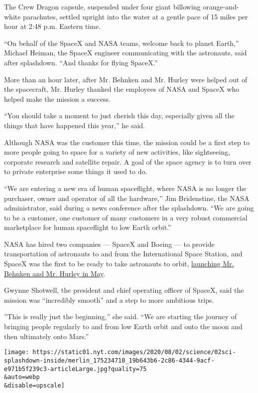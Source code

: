 The Crew Dragon capsule, suspended under four giant billowing
orange-and-white parachutes, settled upright into the water at a gentle
pace of 15 miles per hour at 2:48 p.m. Eastern time.

``On behalf of the SpaceX and NASA teams, welcome back to planet
Earth,'' Michael Heiman, the SpaceX engineer communicating with the
astronauts, said after splashdown. ``And thanks for flying SpaceX.''

More than an hour later, after Mr. Behnken and Mr. Hurley were helped
out of the spacecraft, Mr. Hurley thanked the employees of NASA and
SpaceX who helped make the mission a success.

``You should take a moment to just cherish this day, especially given
all the things that have happened this year,'' he said.

Although NASA was the customer this time, the mission could be a first
step to more people going to space for a variety of new activities, like
sightseeing, corporate research and satellite repair. A goal of the
space agency is to turn over to private enterprise some things it used
to do.

``We are entering a new era of human spaceflight, where NASA is no
longer the purchaser, owner and operator of all the hardware,'' Jim
Bridenstine, the NASA administrator, said during a news conference after
the splashdown. ``We are going to be a customer, one customer of many
customers in a very robust commercial marketplace for human spaceflight
to low Earth orbit.''

NASA has hired two companies --- SpaceX and Boeing --- to provide
transportation of astronauts to and from the International Space
Station, and SpaceX was the first to be ready to take astronauts to
orbit,
\href{https://www.nytimes.com/2020/05/30/science/spacex-nasa-astronauts.html}{launching
Mr. Behnken and Mr. Hurley in May}.

Gwynne Shotwell, the president and chief operating officer of SpaceX,
said the mission was ``incredibly smooth'' and a step to more ambitious
trips.

''This is really just the beginning,'' she said. ``We are starting the
journey of bringing people regularly to and from low Earth orbit and
onto the moon and then ultimately onto Mars.''

\texttt{[image: https://static01.nyt.com/images/2020/08/02/science/02sci-splashdown-inside/merlin\_175234710\_19b643b6-2c86-4344-9acf-e971b5f239c3-articleLarge.jpg?quality=75\\\&auto=webp\\\&disable=upscale]}

